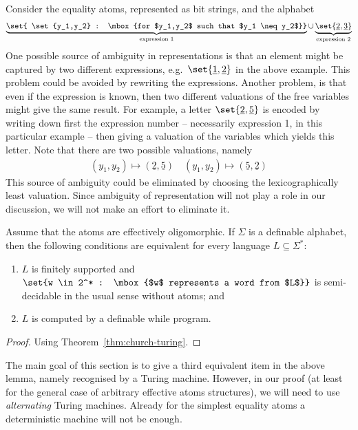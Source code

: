 \begin{ourexample}
	Consider the equality atoms, represented as bit strings, and the alphabet
	\begin{align*}
\underbrace{\set{ \set{y_1,y_2} : \mbox{for $y_1,y_2$ such that $y_1 \neq y_2$}}}_{\text{expression 1}} \cup \underbrace{\set{\underline 2,\underline 3}}_{\text{expression 2}} 
\end{align*}
One possible source of ambiguity in representations is that an element might be captured by two different expressions, e.g.~$\set{\underline 1, \underline 2}$ in the above example. This problem could be avoided by rewriting the expressions. Another problem, is that even if the expression is known, then two different valuations of the free variables might give the same result. For example, a letter $\set{\underline 2, \underline 5}$ is encoded by writing down first the expression number -- necessarily expression 1, in this particular example -- then giving a valuation of the variables which yields this letter. Note that there are two possible valuations, namely
\begin{align*}
 (y_1,y_2) \mapsto (\underline 2, \underline 5) \quad (y_1,y_2) \mapsto (\underline 5, \underline 2)
\end{align*}
This source of ambiguity could be eliminated by choosing the lexicographically least valuation. Since ambiguity of representation will not play a role in our discussion, we will not make an effort to eliminate it.
\end{ourexample}
 

\begin{lemma}\label{lem:computable-tape} Assume that the atoms are effectively oligomorphic.
 If $\Sigma$ is a definable alphabet, then the following conditions are equivalent for every language $L \subseteq \Sigma^*$:
 \begin{enumerate}
 	\item $L$ is finitely supported and $\set{w \in 2^* : \mbox{$w$ represents a word from $L$}}$ is semi-decidable in the usual sense without atoms; and 
 \item $L$ is computed by a definable while program.
 \end{enumerate}
\end{lemma}
\begin{proof}
	Using Theorem~\ref{thm:church-turing}.
\end{proof}

The main goal of this section is to give a third equivalent item in the above lemma, namely recognised by a Turing machine. However, in our proof (at least for the general case of arbitrary effective atoms structures), we will need to use \emph{alternating} Turing machines. Already for the simplest equality atoms a deterministic machine will not be enough. 



